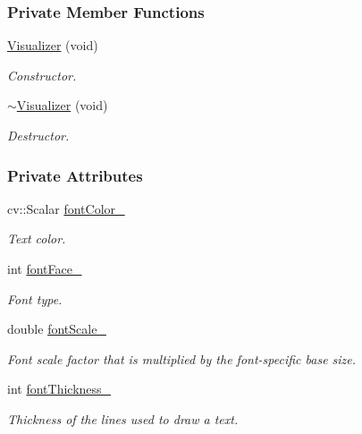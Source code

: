 \subsubsection*{Private Member Functions}
\begin{DoxyCompactItemize}
\item 
\hyperlink{group___core_a3611c9e093d8d855f72bcad4757ce188}{Visualizer} (void)
\begin{DoxyCompactList}\small\item\em Constructor. \end{DoxyCompactList}\item 
\hyperlink{group___core_a28c30d39ef9921a98d5b714ef1256186}{$\sim$\-Visualizer} (void)
\begin{DoxyCompactList}\small\item\em Destructor. \end{DoxyCompactList}\end{DoxyCompactItemize}
\subsubsection*{Private Attributes}
\begin{DoxyCompactItemize}
\item 
cv\-::\-Scalar \hyperlink{group___core_adc3d19a03ae171272bc5737df927027b}{font\-Color\-\_\-}
\begin{DoxyCompactList}\small\item\em Text color. \end{DoxyCompactList}\item 
int \hyperlink{group___core_a0aa6d2b6b8db04a4242fbfec555c88d1}{font\-Face\-\_\-}
\begin{DoxyCompactList}\small\item\em Font type. \end{DoxyCompactList}\item 
double \hyperlink{group___core_a9b91ed2be01274b57be07c01545ff802}{font\-Scale\-\_\-}
\begin{DoxyCompactList}\small\item\em Font scale factor that is multiplied by the font-\/specific base size. \end{DoxyCompactList}\item 
int \hyperlink{group___core_a5438944d7404d76256e5d0fb4ddecdaf}{font\-Thickness\-\_\-}
\begin{DoxyCompactList}\small\item\em Thickness of the lines used to draw a text. \end{DoxyCompactList}\end{DoxyCompactItemize}



